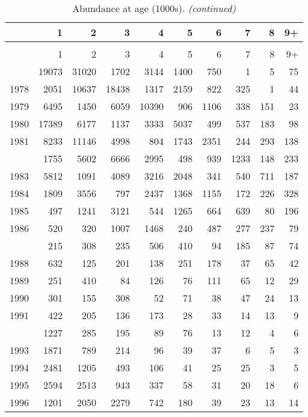 \documentclass[
]{article}
\begin{document}
\begin{longtable}[t]{lrrrrrrrrr}
\caption{\label{tab:NAA-table}Abundance at age (1000s).}\\
\toprule
  & 1 & 2 & 3 & 4 & 5 & 6 & 7 & 8 & 9+\\
\midrule
\endfirsthead
\caption[]{Abundance at age (1000s). \textit{(continued)}}\\
\toprule
  & 1 & 2 & 3 & 4 & 5 & 6 & 7 & 8 & 9+\\
\midrule
\endhead

\endfoot
\bottomrule
\endlastfoot
1977 & 19073 & 31020 & 1702 & 3144 & 1400 & 750 & 1 & 5 & 75\\
1978 & 2051 & 10637 & 18438 & 1317 & 2159 & 822 & 325 & 1 & 44\\
1979 & 6495 & 1450 & 6059 & 10390 & 906 & 1106 & 338 & 151 & 23\\
1980 & 17389 & 6177 & 1137 & 3333 & 5037 & 499 & 537 & 183 & 98\\
1981 & 8233 & 11146 & 4998 & 804 & 1743 & 2351 & 244 & 293 & 138\\
\addlinespace
1982 & 1755 & 5602 & 6666 & 2995 & 498 & 939 & 1233 & 148 & 233\\
1983 & 5812 & 1091 & 4089 & 3216 & 2048 & 341 & 540 & 711 & 187\\
1984 & 1809 & 3556 & 797 & 2437 & 1368 & 1155 & 172 & 226 & 328\\
1985 & 497 & 1241 & 3121 & 544 & 1265 & 664 & 639 & 80 & 196\\
1986 & 520 & 320 & 1007 & 1468 & 240 & 487 & 277 & 237 & 79\\
\addlinespace
1987 & 215 & 308 & 235 & 506 & 410 & 94 & 185 & 87 & 74\\
1988 & 632 & 125 & 201 & 138 & 251 & 178 & 37 & 65 & 42\\
1989 & 251 & 410 & 84 & 126 & 76 & 111 & 65 & 12 & 29\\
1990 & 301 & 155 & 308 & 52 & 71 & 38 & 47 & 24 & 13\\
1991 & 422 & 205 & 136 & 173 & 28 & 33 & 14 & 13 & 9\\
\addlinespace
1992 & 1227 & 285 & 195 & 89 & 76 & 13 & 12 & 4 & 6\\
1993 & 1871 & 789 & 214 & 96 & 39 & 37 & 6 & 5 & 3\\
1994 & 2481 & 1205 & 493 & 106 & 41 & 25 & 25 & 3 & 5\\
1995 & 2594 & 2513 & 943 & 337 & 58 & 31 & 20 & 18 & 6\\
1996 & 1201 & 2050 & 2279 & 742 & 180 & 39 & 23 & 13 & 14\\

\end{longtable}
\end{document}
